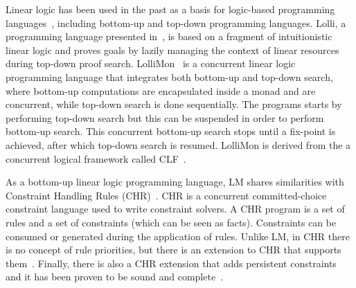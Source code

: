 Linear logic has been used in the past as a basis for logic-based programming languages~\cite{Miller85anoverview}, including bottom-up and top-down programming languages. Lolli, a programming language presented in~\cite{Hodas94logicprogramming}, is based on a fragment of intuitionistic linear logic
and proves goals by lazily managing the context of linear resources during top-down proof search. LolliMon~\cite{Lopez:2005:MCL:1069774.1069778} is a concurrent linear logic programming language that integrates both bottom-up and top-down search, where bottom-up computations are encapsulated inside a monad and are concurrent, while top-down search is done sequentially. The programs starts by performing top-down search but this can be suspended in order to perform bottom-up search. This concurrent bottom-up search stops until a fix-point is achieved, after which top-down search is resumed. LolliMon is derived from the a concurrent logical framework called CLF~\cite{Watkins:2004uq,Cervesato02aconcurrent,Watkins03aconcurrent}.

As a bottom-up linear logic programming language, LM shares similarities with Constraint Handling Rules (CHR)~\cite{Betz:2005kx,Betz:2013:LBA:2422085.2422086}.
CHR is a concurrent committed-choice constraint language used to write constraint solvers. A CHR program is a set of rules and
a set of constraints (which can be seen as facts). Constraints can be consumed or generated during the application of rules.
Unlike LM, in CHR there is no
concept of rule priorities, but there is an extension to CHR that supports them~\cite{DeKoninck:2007:URP:1273920.1273924}.
Finally, there is also a CHR extension that adds persistent constraints and it has been proven to be sound and complete~\cite{DBLP:journals/corr/abs-1007-3829}.

\iffalse
Many programming languages . Although there are a few logic programming languages such as P2~\cite{Loo-condie-garofalakis-p2},
Meld~\cite{ashley-rollman-iclp09}, or Dedalus~\cite{Alvaro:EECS-2009-173} that already do this, they are based on classical logic, where facts are persistent. For most of these systems, there's no concept of state, except for Dedalus where state is modeled as time.

Graph Transformation Systems (GTS)~\cite{Ehrig:2004vn}, commonly used to model distributed systems, perform rewriting of graphs through
a set of graph productions. GTS also introduces
concepts of parallelism, where it may be possible to apply several transformations at the same time. In principle, it should be possible to model
LM programs as a graph transformation: we directly map the LM graph of nodes to GTS's initial graph and consider logical facts as nodes that are connected
to LM's nodes. Each LM rule is then a graph production that manipulates the node's neighbors (the database) or sends new facts to other nodes.
On the other hand, it is also possible to embed GTS inside CHR~\cite{Raiser:2011:AGT:1972935.1972938}.
\fi